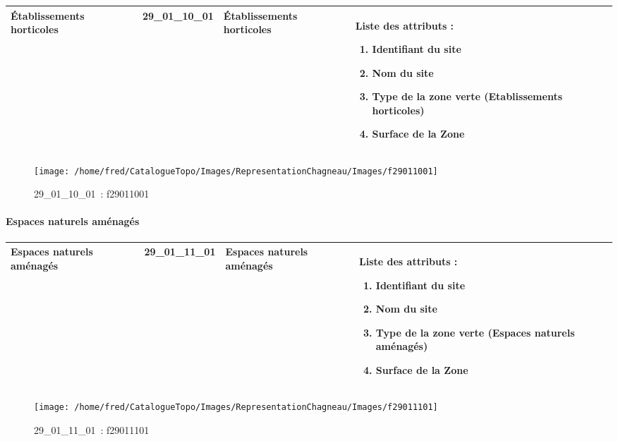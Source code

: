 \documentclass[12pt,titlepage]{book}
\begin{document}
\renewcommand{\arraystretch}{1.2}
\begin{supertabular}{|p{10cm}|c|p{13cm}|p{12cm}|}
 Établissements horticoles & 29\_01\_10\_01 & Établissements horticoles & Liste des attributs :
\begin{enumerate}
  \item Identifiant du site  \item Nom du site  \item Type de la zone verte (Etablissements horticoles)  \item Surface de la Zone\end{enumerate}
\\
\hline
\end{supertabular}
\begin{figure}[h!]
  \hfill         %
  \begin{minipage}[t]{3cm}
    \begin{center}
      \texttt{[image: /home/fred/CatalogueTopo/Images/RepresentationChagneau/Images/f29011001]}
      \caption[~29\_01\_10\_01]{\small{29\_01\_10\_01~:} \tiny{f29011001}}\label{f29011001}
    \end{center}
  \end{minipage}
\end{figure}


\paragraph{Espaces naturels aménagés}
\noindent
\vspace{\baselineskip}

\renewcommand{\arraystretch}{1.2}
\begin{supertabular}{|p{10cm}|c|p{13cm}|p{12cm}|}
 Espaces naturels aménagés & 29\_01\_11\_01 & Espaces naturels aménagés & Liste des attributs :
\begin{enumerate}
  \item Identifiant du site  \item Nom du site  \item Type de la zone verte (Espaces naturels aménagés)  \item Surface de la Zone\end{enumerate}
\\
\hline
\end{supertabular}
\begin{figure}[h!]
  \hfill         %
  \begin{minipage}[t]{3cm}
    \begin{center}
      \texttt{[image: /home/fred/CatalogueTopo/Images/RepresentationChagneau/Images/f29011101]}
      \caption[~29\_01\_11\_01]{\small{29\_01\_11\_01~:} \tiny{f29011101}}\label{f29011101}
    \end{center}
  \end{minipage}
\end{figure}
\end{document}
